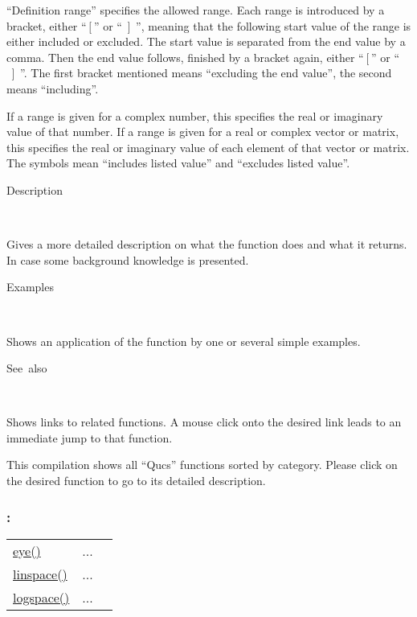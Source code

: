 \medskip{}
{}``Definition range'' specifies the allowed range. Each range is
introduced by a bracket, either {}``$\left[\right.$'' or {}``$\left]\right.$'',
meaning that the following start value of the range is either included
or excluded. The start value is separated from the end value by a
comma. Then the end value follows, finished by a bracket again, either
{}``$\left[\right.$'' or {}``$\left]\right.$''. The first bracket
mentioned means {}``excluding the end value'', the second means
{}``including''.
\vspace{12pt}

If a range is given for a complex number, this specifies the real
or imaginary value of that number. If a range is given for a real
or complex vector or matrix, this specifies the real or imaginary
value of each element of that vector or matrix. The symbols mean {}``includes
listed value'' and {}``excludes listed value''.

\begin{description}
\item [Description]~
\end{description}
Gives a more detailed description on what the function does and what
it returns. In case some background knowledge is presented.

\begin{description}
\item [Examples]~
\end{description}
Shows an application of the function by one or several simple examples.

\begin{description}
\item [See~also]~
\end{description}
Shows links to related functions. A mouse click onto the desired link
leads to an immediate jump to that function.



This compilation shows all {}``Qucs'' functions sorted by category.
Please click on the desired function to go to its detailed description.




\subsubsection*{: }

\textcolor{blue}{}\begin{tabular}{>{\raggedleft}p{3cm}>{\centering}p{0.5cm}l}
\textcolor{blue}{\hyperlink{eye}{eye()}}&
...&
 \begin{NoHyper} \nameref{par:identity} \end{NoHyper}\tabularnewline
\textcolor{blue}{\hyperlink{linspace}{linspace()}}&
...&
 \begin{NoHyper} \nameref{par:linspace} \end{NoHyper}\tabularnewline
\textcolor{blue}{\hyperlink{logspace}{logspace()}}&
...&
 \begin{NoHyper} \nameref{par:logspace} \end{NoHyper}\tabularnewline
\end{tabular}


